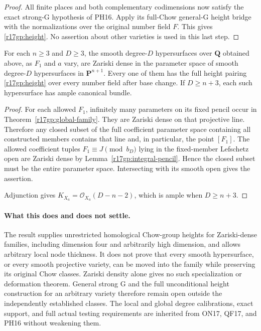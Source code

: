 \begin{proof}
All finite places and both complementary codimensions now
satisfy the exact strong-G hypothesis of PH16. Apply its
full-Chow general-G height bridge with the normalizations
over the original number field $F$. This gives
\eqref{r17gp:height}. No assertion about other varieties is
used in this last step.
\end{proof}

\begin{corollary}
\label{r17gp:dense}
For each $n\ge3$ and $D\ge3$, the smooth degree-$D$
hypersurfaces over $\mathbf Q$ obtained above, as $F_1$
and $a$ vary, are Zariski dense in the parameter space of
smooth degree-$D$ hypersurfaces in $\mathbf P^{n+1}$.
Every one of them has the full height pairing
\eqref{r17gp:height} over every number field after base change.
If $D\ge n+3$, each such hypersurface has ample canonical
bundle.
\end{corollary}

\begin{proof}
For each allowed $F_1$, infinitely many parameters on its
fixed pencil occur in Theorem~\ref{r17gp:global-family}.
They are Zariski dense on that projective line. Therefore
any closed subset of the full coefficient parameter space
containing all constructed members contains that line and,
in particular, the point $[F_1]$. The allowed coefficient
tuples $F_1\equiv J\pmod{b_D}$ lying in the fixed-member
Lefschetz open are Zariski dense by
Lemma~\ref{r17gp:integral-pencil}. Hence the closed subset
must be the entire parameter space. Intersecting with its
smooth open gives the assertion.

Adjunction gives
$K_{X_a}=\mathcal O_{X_a}(D-n-2)$, which is ample when
$D\ge n+3$.
\end{proof}

\paragraph{What this does and does not settle.}
The result supplies unrestricted homological Chow-group heights
for Zariski-dense families, including dimension four and arbitrarily
high dimension, and allows arbitrary local node thickness.
It does not prove that every smooth hypersurface, or every smooth
projective variety, can be moved into the family while preserving
its original Chow classes. Zariski density alone gives no such
specialization or deformation theorem. General strong G and the
full unconditional height construction for an arbitrary variety
therefore remain open outside the independently established
classes. The local and global degree calibrations, exact support,
and full actual testing requirements are inherited from ON17,
QF17, and PH16 without weakening them.
